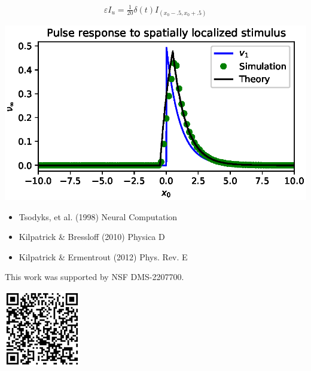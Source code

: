 \documentclass[landscape,final]{baposter}
\begin{document}
\begin{poster}
{\begin{itemize}
		\[
			\varepsilon I_u = \tfrac{1}{20} \delta(t) I_{(x_0 - .5, x_0 + .5)}
		\]
		\begin{center}
			\includegraphics[width=.9\linewidth, trim={0cm, 0cm, 0cm, .2cm}, clip=true]{spatially_localized}
		\end{center}
	\end{itemize}
}

{
\begin{minipage}{.7\textwidth} \begin{itemize}
		\item Tsodyks, et al. (1998) Neural Computation
		\item Kilpatrick \& Bressloff (2010) Physica D 
		\item Kilpatrick \& Ermentrout (2012) Phys. Rev. E
	\end{itemize}
This work was supported by NSF DMS-2207700.
\end{minipage}
\begin{minipage}{.25\textwidth}
\includegraphics[width=\linewidth, trim={.7cm, .7cm, .7cm, .7cm}, clip=true]{QR}
\end{minipage}
\bigbreak

}
\end{poster}
\end{document}
